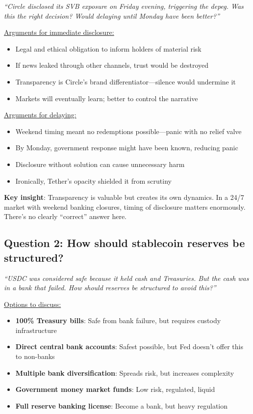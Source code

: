 \documentclass[11pt]{article}
\begin{document}
\textit{``Circle disclosed its SVB exposure on Friday evening, triggering the depeg. Was this the right decision? Would delaying until Monday have been better?''}

\medskip
\noindent\underline{Arguments for immediate disclosure:}
\begin{itemize}[leftmargin=*]
\item Legal and ethical obligation to inform holders of material risk
\item If news leaked through other channels, trust would be destroyed
\item Transparency is Circle's brand differentiator---silence would undermine it
\item Markets will eventually learn; better to control the narrative
\end{itemize}

\medskip
\noindent\underline{Arguments for delaying:}
\begin{itemize}[leftmargin=*]
\item Weekend timing meant no redemptions possible---panic with no relief valve
\item By Monday, government response might have been known, reducing panic
\item Disclosure without solution can cause unnecessary harm
\item Ironically, Tether's opacity shielded it from scrutiny
\end{itemize}

\medskip
\noindent\textbf{Key insight}: Transparency is valuable but creates its own dynamics. In a 24/7 market with weekend banking closures, timing of disclosure matters enormously. There's no clearly ``correct'' answer here.

\subsection*{Question 2: How should stablecoin reserves be structured?}

\textit{``USDC was considered safe because it held cash and Treasuries. But the cash was in a bank that failed. How should reserves be structured to avoid this?''}

\medskip
\noindent\underline{Options to discuss:}
\begin{itemize}[leftmargin=*]
\item \textbf{100\% Treasury bills}: Safe from bank failure, but requires custody infrastructure
\item \textbf{Direct central bank accounts}: Safest possible, but Fed doesn't offer this to non-banks
\item \textbf{Multiple bank diversification}: Spreads risk, but increases complexity
\item \textbf{Government money market funds}: Low risk, regulated, liquid
\item \textbf{Full reserve banking license}: Become a bank, but heavy regulation
\end{itemize}
\end{document}
